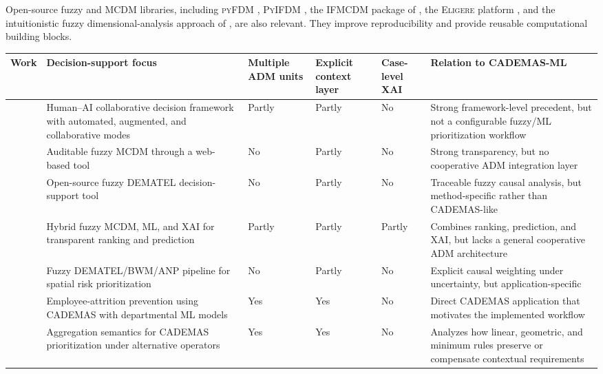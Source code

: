 Open-source fuzzy and MCDM libraries, including \textsc{pyFDM} \citep{Wieckowski2022}, \textsc{PyIFDM} \citep{Wieckowski2023}, the \textsc{IFMCDM} package of \citet{Roszkowska2024}, the \textsc{Eligere} platform \citep{Grazioso2023}, and the intuitionistic fuzzy dimensional-analysis approach of \citet{PerezDominguez2024}, are also relevant. They improve reproducibility and provide reusable computational building blocks.

\begin{table}[!tb]
{\footnotesize
\begin{tabularx}{\textwidth}{>{\raggedright\arraybackslash}p{1.85cm} >{\raggedright\arraybackslash}X >{\centering\arraybackslash}p{1.35cm} >{\centering\arraybackslash}p{1.35cm} >{\centering\arraybackslash}p{1.35cm} >{\raggedright\arraybackslash}X}
 \toprule
 \textbf{Work} & \textbf{Decision-support focus} & \textbf{Multiple ADM units} & \textbf{Explicit context layer} & \textbf{Case-level XAI} & \textbf{Relation to CADEMAS-ML} \\
 \midrule
 \citet{Tariq2024a} & Human--AI collaborative decision framework with automated, augmented, and collaborative modes & Partly & Partly & No & Strong framework-level precedent, but not a configurable fuzzy/ML prioritization workflow \\
 \citet{Wieckowski2024} & Auditable fuzzy MCDM through a web-based tool & No & Partly & No & Strong transparency, but no cooperative ADM integration layer \\
 \citet{Chekry2024} & Open-source fuzzy DEMATEL decision-support tool & No & Partly & No & Traceable fuzzy causal analysis, but method-specific rather than CADEMAS-like \\
 \citet{Ozkurt2025} & Hybrid fuzzy MCDM, ML, and XAI for transparent ranking and prediction & Partly & Partly & Partly & Combines ranking, prediction, and XAI, but lacks a general cooperative ADM architecture \\
 \citet{Sahraei2022} & Fuzzy DEMATEL/BWM/ANP pipeline for spatial risk prioritization & No & Partly & No & Explicit causal weighting under uncertainty, but application-specific \\
 \midrule
 \citet{Godz2026} & Employee-attrition prevention using CADEMAS with departmental ML models & Yes & Yes & No & Direct CADEMAS application that motivates the implemented workflow \\
 \citet{novoa2026aggregation} & Aggregation semantics for CADEMAS prioritization under alternative operators & Yes & Yes & No & Analyzes how linear, geometric, and minimum rules preserve or compensate contextual requirements \\

\end{tabularx}}
\end{table}
